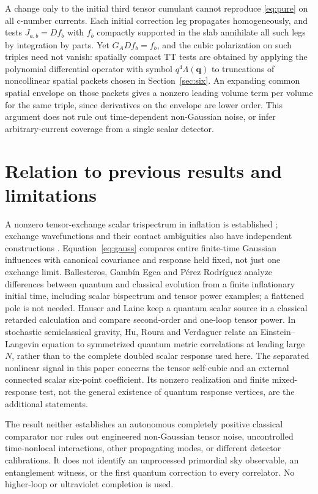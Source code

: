 \documentclass[11pt]{article}
\newcommand{\bq}{\boldsymbol q}
\begin{document}
A change only to the initial third tensor cumulant cannot reproduce \eqref{eq:pure} on all c-number currents. Each initial correction leg propagates homogeneously, and tests \(J_{a,b}=D f_b\) with \(f_b\) compactly supported in the slab annihilate all such legs by integration by parts. Yet \(G_A D f_b=f_b\), and the cubic polarization on such triples need not vanish: spatially compact TT tests are obtained by applying the polynomial differential operator with symbol \(q^4\Lambda(\bq)\) to truncations of noncollinear spatial packets chosen in Section~\ref{sec:six}. An expanding common spatial envelope on those packets gives a nonzero leading volume term per volume for the same triple, since derivatives on the envelope are lower order. This argument does not rule out time-dependent non-Gaussian noise, or infer arbitrary-current coverage from a single scalar detector.




\section{Relation to previous results and limitations}
A nonzero tensor-exchange scalar trispectrum in inflation is established \cite{SeerySlothVernizzi}; exchange wavefunctions and their contact ambiguities also have independent constructions \cite{JPS}. Equation~\eqref{eq:gauss} compares entire finite-time Gaussian influences with canonical covariance and response held fixed, not just one exchange limit. Ballesteros, Gamb\'in Egea and P\'erez Rodr\'iguez \cite{Ballesteros} analyze differences between quantum and classical evolution from a finite inflationary initial time, including scalar bispectrum and tensor power examples; a flattened pole is not needed. Hauser and Laine \cite{HauserLaine} keep a quantum scalar source in a classical retarded calculation and compare second-order and one-loop tensor power. In stochastic semiclassical gravity, Hu, Roura and Verdaguer \cite{HuRouraVerdaguer} relate an Einstein--Langevin equation to symmetrized quantum metric correlations at leading large \(N\), rather than to the complete doubled scalar response used here. The separated nonlinear signal in this paper concerns the tensor self-cubic and an external connected scalar six-point coefficient. Its nonzero realization and finite mixed-response test, not the general existence of quantum response vertices, are the additional statements.

The result neither establishes an autonomous completely positive classical comparator nor rules out engineered non-Gaussian tensor noise, uncontrolled time-nonlocal interactions, other propagating modes, or different detector calibrations. It does not identify an unprocessed primordial sky observable, an entanglement witness, or the first quantum correction to every correlator. No higher-loop or ultraviolet completion is used.
\end{document}
